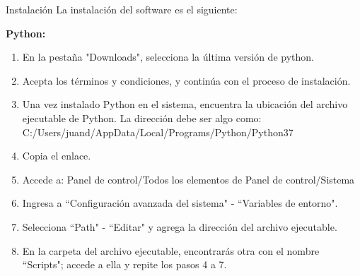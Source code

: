 \begin{frame}[t]{Instalación}\vspace{5pt}
La instalación del software es el siguiente:

\textbf{Python:}

\begin{enumerate}
	\item En la pestaña "Downloads", selecciona la última versión de python. 
	\item Acepta los términos y condiciones, y continúa con el proceso de instalación.
	\item Una vez instalado Python en el sistema, encuentra la ubicación del archivo ejecutable de Python. La dirección debe ser algo como: C:/Users/juand/AppData/Local/Programs/Python/Python37
	\item Copia el enlace.
	\item Accede a: Panel de control/Todos los elementos de Panel de control/Sistema
	\item Ingresa a ``Configuración avanzada del sistema" - ``Variables de entorno".
	\item Selecciona ``Path" - ``Editar" y agrega la dirección del archivo ejecutable.
	\item En la carpeta del archivo ejecutable, encontrarás otra con el nombre ``Scripts"; accede a ella y repite los pasos 4 a 7.
\end{enumerate}

\end{frame}